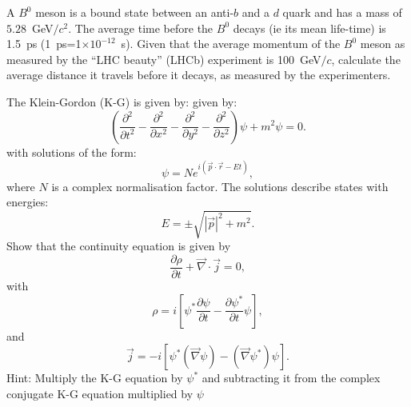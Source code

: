 A $B^0$ meson is a bound state between an anti-$b$ and a $d$ quark and has a mass of $5.28$~GeV$/c^2$. The average time before the $B^0$ decays (ie its mean life-time) is 1.5~ps (1~ps=1$\times 10^{-12}$~s). Given that the average momentum of the $B^0$ meson as measured by the ``LHC beauty'' (LHCb) experiment is 100~GeV$/c$, calculate the average distance it travels before it decays, as measured by the experimenters.

The Klein-Gordon (K-G) is given by:
given by:
\[
\left(\frac{\partial^{2}}{\partial
  t^{2}}-\frac{\partial^{2}}{\partial x^{2}} -
  \frac{\partial^{2}}{\partial y^{2}} - \frac{\partial^{2}}{\partial z^{2}}\right)\psi+m^{2}\psi=0.
\]
with solutions of the form: 
\[
\psi=Ne^{i(\vec{p}\cdot\vec{r}-Et)},
\]
where $N$ is a complex normalisation factor. The solutions describe
states with energies:
  \[E=\pm\sqrt{|\vec{p}|^2+m^2}.\]
 Show that the continuity
  equation is given by
  \[
     \frac{\partial\rho}{\partial t}+\vec{\nabla}\cdot\vec{j}=0,
  \]
with
\[
   \rho = i\left[\psi^*\frac{\partial\psi}{\partial t}-\frac{\partial\psi^*}{\partial t}\psi\right],
\]
and
\[
   \vec{j} = -i\left[\psi^*(\vec{\nabla}\psi)-(\vec{\nabla}\psi^*)\psi\right].
   \]
   Hint: Multiply the K-G equation by $\psi^*$ and subtracting it from
   the complex conjugate K-G equation multiplied by $\psi$
\answerbox{
  
}


